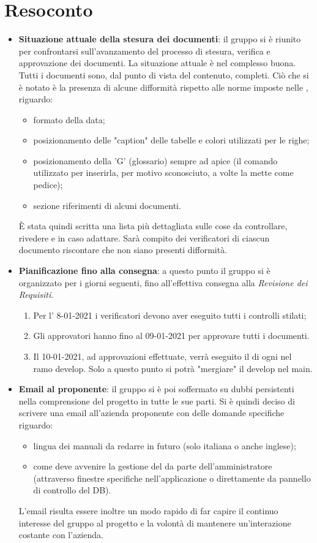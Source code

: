 \section{Resoconto}
\begin{itemize}
\item \textbf{Situazione attuale della stesura dei documenti}: il gruppo si è riunito per confrontarsi sull'avanzamento del processo di stesura, verifica e approvazione dei documenti. La situazione attuale è nel complesso buona. Tutti i documenti sono, dal punto di vista del contenuto, completi. Ciò che si è notato è la presenza di alcune difformità rispetto alle norme imposte nelle \NdPv{}, riguardo:
	\begin{itemize}
		\item formato della data;
		\item posizionamento delle "caption" delle tabelle e colori utilizzati per le righe;
		\item posizionamento della 'G' (glossario) sempre ad apice (il comando utilizzato per inserirla, per motivo sconosciuto, a volte la mette come pedice);
		\item sezione riferimenti di alcuni documenti.
	\end{itemize} 
È stata quindi scritta una lista più dettagliata sulle cose da controllare, rivedere e in caso adattare. Sarà compito dei verificatori di ciascun documento riscontare che non siano presenti difformità. 

\item \textbf{Pianificazione fino alla consegna}: a questo punto il gruppo si è organizzato per i giorni seguenti, fino all'effettiva consegna alla \textit{Revisione dei Requisiti}. 
	\begin{enumerate}
		\item Per l' 8-01-2021 i verificatori devono aver eseguito tutti i controlli stilati;
		\item Gli approvatori hanno fino al 09-01-2021 per approvare tutti i documenti.
		\item Il 10-01-2021, ad approvazioni effettuate, verrà eseguito il  di ogni  nel ramo develop. Solo a questo punto si potrà "mergiare" il develop nel main.
	\end{enumerate}
	
\item \textbf{Email al proponente}: il gruppo si è poi soffermato su dubbi persistenti nella comprensione del progetto in tutte le sue parti. Si è quindi deciso di scrivere una email all'azienda proponente con delle domande specifiche riguardo:
	\begin{itemize}
		\item lingua dei manuali da redarre in futuro (solo italiana o anche inglese);
		\item come deve avvenire la gestione del  da parte dell'amministratore (attraverso finestre specifiche nell'applicazione o direttamente da pannello di controllo del DB).
	\end{itemize}
L'email risulta essere inoltre un modo rapido di far capire il continuo interesse del gruppo al progetto e la volontà di mantenere un'interazione costante con l'azienda.
\end{itemize}
\newpage